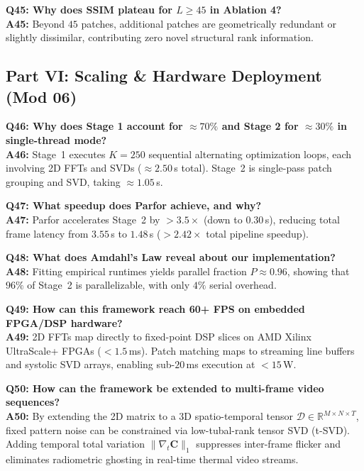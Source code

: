 \documentclass[10pt,conference]{IEEEtran}
\begin{document}
\vspace{0.4em}\noindent\textbf{Q45: Why does SSIM plateau for $L \ge 45$ in Ablation 4?}\\
\textbf{A45:} Beyond $45$ patches, additional patches are geometrically redundant or slightly dissimilar, contributing zero novel structural rank information.

\subsection{Part VI: Scaling \& Hardware Deployment (Mod 06)}

\noindent\textbf{Q46: Why does Stage 1 account for $\approx 70\%$ and Stage 2 for $\approx 30\%$ in single-thread mode?}\\
\textbf{A46:} Stage~1 executes $K = 250$ sequential alternating optimization loops, each involving 2D FFTs and SVDs ($\approx 2.50$\,s total). Stage~2 is single-pass patch grouping and SVD, taking $\approx 1.05$\,s.

\vspace{0.4em}\noindent\textbf{Q47: What speedup does Parfor achieve, and why?}\\
\textbf{A47:} Parfor accelerates Stage~2 by $> 3.5\times$ (down to $0.30$\,s), reducing total frame latency from $3.55$\,s to $1.48$\,s ($> 2.42\times$ total pipeline speedup).

\vspace{0.4em}\noindent\textbf{Q48: What does Amdahl's Law reveal about our implementation?}\\
\textbf{A48:} Fitting empirical runtimes yields parallel fraction $P \approx 0.96$, showing that $96\%$ of Stage~2 is parallelizable, with only $4\%$ serial overhead.

\vspace{0.4em}\noindent\textbf{Q49: How can this framework reach 60+ FPS on embedded FPGA/DSP hardware?}\\
\textbf{A49:} 2D FFTs map directly to fixed-point DSP slices on AMD Xilinx UltraScale+ FPGAs ($< 1.5$\,ms). Patch matching maps to streaming line buffers and systolic SVD arrays, enabling sub-$20$\,ms execution at $< 15$\,W.

\vspace{0.4em}\noindent\textbf{Q50: How can the framework be extended to multi-frame video sequences?}\\
\textbf{A50:} By extending the 2D matrix to a 3D spatio-temporal tensor $\boldsymbol{\mathcal{D}} \in \mathbb{R}^{M \times N \times T}$, fixed pattern noise can be constrained via low-tubal-rank tensor SVD (t-SVD). Adding temporal total variation $\|\nabla_t \mathbf{C}\|_1$ suppresses inter-frame flicker and eliminates radiometric ghosting in real-time thermal video streams.
\end{document}
